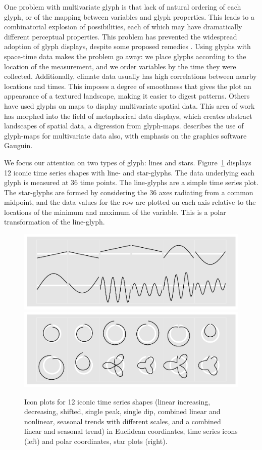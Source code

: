\documentclass[oneside]{article}
\begin{document}
One problem with multivariate glyph is that lack of natural ordering of each glyph, or of the mapping between variables and glyph properties. This leads to a combinatorial explosion of possibilities, each of which may have dramatically different perceptual properties. This problem has prevented the widespread adoption of glyph displays, despite some proposed remedies \citep{kleiner:1981,hurley:2010}. Using glyphs with space-time data makes the problem go away: we place glyphs according to the location of the measurement, and we order variables by the time they were collected. Additionally, climate data usually has high correlations between nearby locations and times. This imposes a degree of smoothness that gives the plot an appearance of a textured  landscape, making it easier to digest patterns. Others \citet{pickett:1988} have used glyphs on maps to display multivariate spatial data. This area of work has morphed into the field of metaphorical data displays, which creates abstract landscapes of spatial data, a digression from glyph-maps. \citet{gribov:2006} describes the use of glyph-maps for multivariate data also, with emphasis on the graphics software Gauguin.

We focus our attention on two types of glyph: lines and stars. Figure~\ref{fig:templates} displays 12 iconic time series shapes with line- and star-glyphs. The data underlying each glyph is measured at 36 time points. The line-glyphs are a simple time series plot. The star-glyphs are formed by considering the 36 axes radiating from a common midpoint, and the data values for the row are plotted on each axis relative to the locations of the minimum and maximum of the variable. This is a polar transformation of the line-glyph.

\begin{figure}[htbp]
  \centering
  \includegraphics[width=0.5\linewidth]{euclid-to-polar-1}%
  \includegraphics[width=0.5\linewidth]{euclid-to-polar-2}

  \caption{Icon plots for 12 iconic time series shapes (linear increasing, decreasing, shifted, single peak, single dip, combined linear and nonlinear, seasonal trends with different scales, and a combined linear and seasonal trend) in Euclidean coordinates, time series icons (left) and polar coordinates, star plots (right).}
  \label{fig:templates}
\end{figure}
\end{document}
